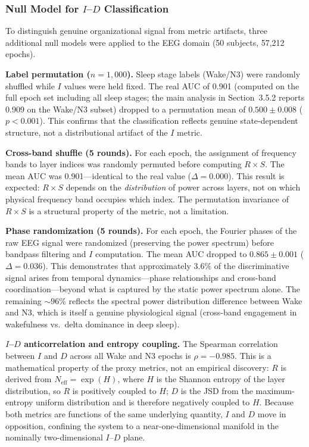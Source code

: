 \documentclass[12pt,a4paper]{article}
\begin{document}
\subsubsection{Null Model for $I$--$D$ Classification}

To distinguish genuine organizational signal from metric artifacts, three additional null models were applied to the EEG domain (50 subjects, 57,212 epochs).

\textbf{Label permutation ($n = 1{,}000$).} Sleep stage labels (Wake/N3) were randomly shuffled while $I$ values were held fixed. The real AUC of 0.901 (computed on the full epoch set including all sleep stages; the main analysis in Section~3.5.2 reports 0.909 on the Wake/N3 subset) dropped to a permutation mean of $0.500 \pm 0.008$ ($p < 0.001$). This confirms that the classification reflects genuine state-dependent structure, not a distributional artifact of the $I$ metric.

\textbf{Cross-band shuffle (5 rounds).} For each epoch, the assignment of frequency bands to layer indices was randomly permuted before computing $R \times S$. The mean AUC was 0.901---identical to the real value ($\Delta = 0.000$). This result is expected: $R \times S$ depends on the \emph{distribution} of power across layers, not on which physical frequency band occupies which index. The permutation invariance of $R \times S$ is a structural property of the metric, not a limitation.

\textbf{Phase randomization (5 rounds).} For each epoch, the Fourier phases of the raw EEG signal were randomized (preserving the power spectrum) before bandpass filtering and $I$ computation. The mean AUC dropped to $0.865 \pm 0.001$ ($\Delta = 0.036$). This demonstrates that approximately 3.6\% of the discriminative signal arises from temporal dynamics---phase relationships and cross-band coordination---beyond what is captured by the static power spectrum alone. The remaining ${\sim}96$\% reflects the spectral power distribution difference between Wake and N3, which is itself a genuine physiological signal (cross-band engagement in wakefulness vs.\ delta dominance in deep sleep).

\textbf{$I$--$D$ anticorrelation and entropy coupling.} The Spearman correlation between $I$ and $D$ across all Wake and N3 epochs is $\rho = -0.985$. This is a mathematical property of the proxy metrics, not an empirical discovery: $R$ is derived from $N_{\text{eff}} = \exp(H)$, where $H$ is the Shannon entropy of the layer distribution, so $R$ is positively coupled to $H$; $D$ is the JSD from the maximum-entropy uniform distribution and is therefore negatively coupled to $H$. Because both metrics are functions of the same underlying quantity, $I$ and $D$ move in opposition, confining the system to a near-one-dimensional manifold in the nominally two-dimensional $I$--$D$ plane.
\end{document}
